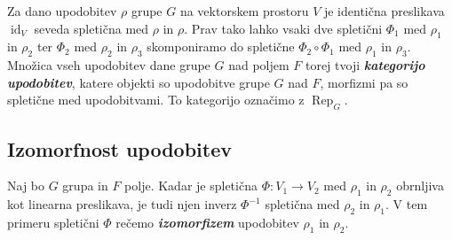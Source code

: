 \documentclass[11pt]{book}
\DeclareMathOperator\Rep{Rep}
\DeclareMathOperator\id{id}
\def\definicija{\color{rdeca}\bf\em}
\theoremstyle{definition}
\theoremstyle{zgled}
\theoremstyle{odprtproblem}
\theoremstyle{domacanaloga}
\theoremstyle{izrek}
\begin{document}
Za dano upodobitev $\rho$ grupe $G$ na vektorskem prostoru $V$ je identična preslikava $\id_V$ seveda spletična med $\rho$ in $\rho$. Prav tako lahko vsaki dve spletični $\Phi_1$ med $\rho_1$ in $\rho_2$ ter $\Phi_2$ med $\rho_2$ in $\rho_3$ skomponiramo do spletične $\Phi_2 \circ \Phi_1$ med $\rho_1$ in $\rho_3$. Množica vseh upodobitev dane grupe $G$ nad poljem $F$ torej tvoji {\definicija kategorijo upodobitev}, katere objekti so upodobitve grupe $G$ nad $F$, morfizmi pa so spletične med upodobitvami. To kategorijo označimo z $\Rep_G$.

\subsection{Izomorfnost upodobitev}

Naj bo $G$ grupa in $F$ polje. Kadar je spletična $\Phi \colon V_1 \to V_2$ med $\rho_1$ in $\rho_2$ obrnljiva kot linearna preslikava, je tudi njen inverz $\Phi^{-1}$ spletična med $\rho_2$ in $\rho_1$. V tem primeru spletični $\Phi$ rečemo {\definicija izomorfizem} upodobitev $\rho_1$ in $\rho_2$. 
\end{document}
